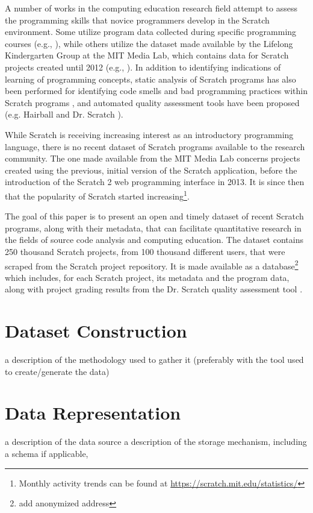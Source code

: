 \documentclass[10pt, conference]{IEEEtran}
\begin{document}
A number of works in the computing education research field attempt to assess the programming skills that novice programmers develop in the Scratch environment.
Some utilize program data collected during specific programming courses (e.g., \cite{meerbaum-salant_learning_2010, wilson_evaluation_2012, Maloney_2008}), while others utilize the dataset made available by the Lifelong Kindergarten Group at the MIT Media Lab, which contains data for Scratch projects created until 2012 (e.g., \cite{fields_2014, yang_2015, Dasgupta_2016}).
In addition to identifying indications of learning of programming concepts, static analysis of Scratch programs has also been performed for identifying code smells and bad programming practices within Scratch programs \cite{Meerbaum_habits_2011, Aivaloglou_2016}, and automated quality assessment tools have been proposed (e.g. Hairball \cite{boe_hairball:_2013} and Dr. Scratch \cite{moreno_automatic_2014}).

While Scratch is receiving increasing interest as an introductory programming language, there is no recent dataset of Scratch programs available to the research community.
The one made available from the MIT Media Lab concerns projects created using the previous, initial version of the Scratch application, before the introduction of the Scratch 2 web programming interface in 2013.
It is since then that the popularity of Scratch started increasing\footnote{Monthly activity trends can be found at \url{https://scratch.mit.edu/statistics/}}.

The goal of this paper is to present an open and timely dataset of recent Scratch programs, along with their metadata, that can facilitate quantitative research in the fields of source code analysis and computing education.
The dataset contains 250 thousand Scratch projects, from 100 thousand different users, that were scraped from the Scratch project repository.
It is made available as a database\footnote{{add anonymized address}} which includes, for each Scratch project, its metadata and the program data, along with project grading results from the Dr. Scratch quality assessment tool \cite{moreno_automatic_2014}.

\section{Dataset Construction}
a description of the methodology used to gather it (preferably with the tool used to create/generate the data)

\section{Data Representation}
a description of the data source
a description of the storage mechanism, including a schema if applicable,
\end{document}
